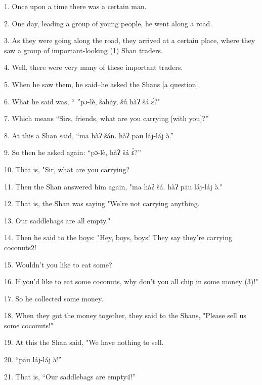 \setcounter{footnote}{0}

1. Once upon a time there was a certain man.

2. One day, leading a group of young people, he went along a road.

3. As they were going along the road, they arrived at a certain place, where they
saw a group of important-looking (1) Shan traders.

4. Well, there were very many of these important traders.

5. When he saw them, he said--he asked the Shans [a question].

6. What he said was, `` ''pɔ-lè, šaháy, šú hàʔ šá ɛ̀?"

7. Which means ``Sirs, friends, what are you carrying [with you]?''

8. At this a Shan said, ``ma hàʔ šán. hàʔ pāu láj-láj ə̀.''

9. So then he asked again: ``pɔ-lè, hàʔ šá ɛ̀?''

10. That is, "Sir, what are you carrying?

11. Then the Shan answered him again, "ma hàʔ šá. hàʔ pāu láj-láj
ə̀."

12. That is, the Shan was saying "We're not carrying anything.

13. Our saddlebags are all empty."

14. Then he said to the boys: "Hey, boys, boys! They say they're carrying
coconuts2!

15. Wouldn't you like to eat some?

16. If you'd like to eat some coconuts, why don't you all chip in some money (3)!"

17. So he collected some money.

18. When they got the money together, they said to the Shans, "Please sell
us some coconuts!"

19. At this the Shan said, "We have nothing to sell.

20. ``pāu láj-láj ə̀!''

21. That is, ``Our saddlebags are empty4!''

